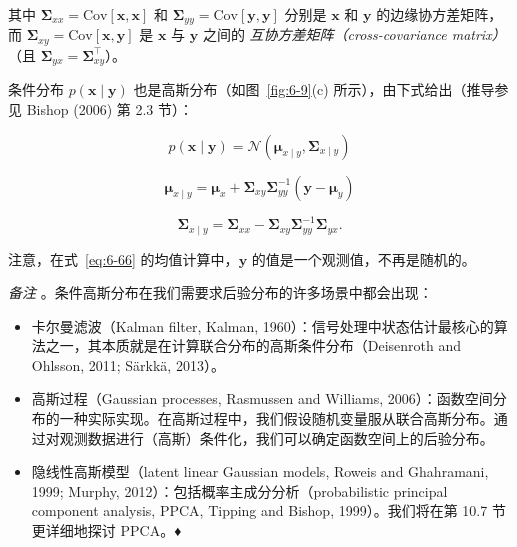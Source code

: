 其中 $ \boldsymbol{\Sigma}_{xx} = \mathrm{Cov}[\boldsymbol{x}, \boldsymbol{x}] $ 和 $ \boldsymbol{\Sigma}_{yy} = \mathrm{Cov}[\boldsymbol{y}, \boldsymbol{y}] $ 分别是 $ \boldsymbol{x} $ 和 $ \boldsymbol{y} $ 的边缘协方差矩阵，而 $ \boldsymbol{\Sigma}_{xy} = \mathrm{Cov}[\boldsymbol{x}, \boldsymbol{y}] $ 是 $ \boldsymbol{x} $ 与 $ \boldsymbol{y} $ 之间的 \emph{互协方差矩阵（cross-covariance matrix）} （且 $ \boldsymbol{\Sigma}_{yx} = \boldsymbol{\Sigma}_{xy}^\top $）。

条件分布 $ p(\boldsymbol{x} \mid \boldsymbol{y}) $ 也是高斯分布（如图~\ref{fig:6-9}(c) 所示），由下式给出（推导参见 Bishop (2006) 第 2.3 节）：

\begin{equation}
p(\boldsymbol{x} \mid \boldsymbol{y}) = \mathcal{N}(\boldsymbol{\mu}_{x \mid y}, \boldsymbol{\Sigma}_{x \mid y})
\tag{6.65}\label{eq:6-65}
\end{equation}

\begin{equation}
\boldsymbol{\mu}_{x \mid y} = \boldsymbol{\mu}_x + \boldsymbol{\Sigma}_{xy}\boldsymbol{\Sigma}_{yy}^{-1}(\boldsymbol{y} - \boldsymbol{\mu}_y)
\tag{6.66}\label{eq:6-66}
\end{equation}

\begin{equation}
\boldsymbol{\Sigma}_{x \mid y} = \boldsymbol{\Sigma}_{xx} - \boldsymbol{\Sigma}_{xy}\boldsymbol{\Sigma}_{yy}^{-1}\boldsymbol{\Sigma}_{yx} .
\tag{6.67}\label{eq:6-67}
\end{equation}

注意，在式~\eqref{eq:6-66} 的均值计算中，$ \boldsymbol{y} $ 的值是一个观测值，不再是随机的。

\emph{备注} 。条件高斯分布在我们需要求后验分布的许多场景中都会出现：

\begin{itemize}
\item 卡尔曼滤波（Kalman filter, Kalman, 1960）：信号处理中状态估计最核心的算法之一，其本质就是在计算联合分布的高斯条件分布（Deisenroth and Ohlsson, 2011; Särkkä, 2013）。
\item 高斯过程（Gaussian processes, Rasmussen and Williams, 2006）：函数空间分布的一种实际实现。在高斯过程中，我们假设随机变量服从联合高斯分布。通过对观测数据进行（高斯）条件化，我们可以确定函数空间上的后验分布。
\item 隐线性高斯模型（latent linear Gaussian models, Roweis and Ghahramani, 1999; Murphy, 2012）：包括概率主成分分析（probabilistic principal component analysis, PPCA, Tipping and Bishop, 1999）。我们将在第 10.7 节更详细地探讨 PPCA。♦
\end{itemize}

